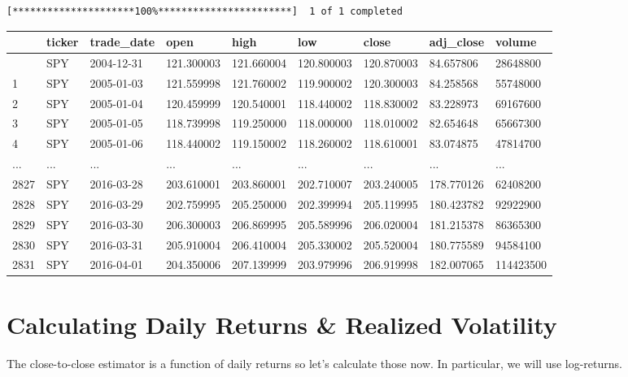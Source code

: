 \documentclass[
  letterpaper,
  DIV=11,
  numbers=noendperiod]{scrreprt}
\begin{document}
\begin{verbatim}
[*********************100%***********************]  1 of 1 completed
\end{verbatim}

\begin{longtable}[]{@{}lllllllll@{}}
\toprule\noalign{}
& ticker & trade\_date & open & high & low & close & adj\_close &
volume \\
\midrule\noalign{}
\endhead
\bottomrule\noalign{}
\endlastfoot
0 & SPY & 2004-12-31 & 121.300003 & 121.660004 & 120.800003 & 120.870003
& 84.657806 & 28648800 \\
1 & SPY & 2005-01-03 & 121.559998 & 121.760002 & 119.900002 & 120.300003
& 84.258568 & 55748000 \\
2 & SPY & 2005-01-04 & 120.459999 & 120.540001 & 118.440002 & 118.830002
& 83.228973 & 69167600 \\
3 & SPY & 2005-01-05 & 118.739998 & 119.250000 & 118.000000 & 118.010002
& 82.654648 & 65667300 \\
4 & SPY & 2005-01-06 & 118.440002 & 119.150002 & 118.260002 & 118.610001
& 83.074875 & 47814700 \\
... & ... & ... & ... & ... & ... & ... & ... & ... \\
2827 & SPY & 2016-03-28 & 203.610001 & 203.860001 & 202.710007 &
203.240005 & 178.770126 & 62408200 \\
2828 & SPY & 2016-03-29 & 202.759995 & 205.250000 & 202.399994 &
205.119995 & 180.423782 & 92922900 \\
2829 & SPY & 2016-03-30 & 206.300003 & 206.869995 & 205.589996 &
206.020004 & 181.215378 & 86365300 \\
2830 & SPY & 2016-03-31 & 205.910004 & 206.410004 & 205.330002 &
205.520004 & 180.775589 & 94584100 \\
2831 & SPY & 2016-04-01 & 204.350006 & 207.139999 & 203.979996 &
206.919998 & 182.007065 & 114423500 \\
\end{longtable}

\hypertarget{calculating-daily-returns-realized-volatility}{%
\section{Calculating Daily Returns \& Realized
Volatility}\label{calculating-daily-returns-realized-volatility}}

The close-to-close estimator is a function of daily returns so let's
calculate those now. In particular, we will use log-returns.
\end{document}
